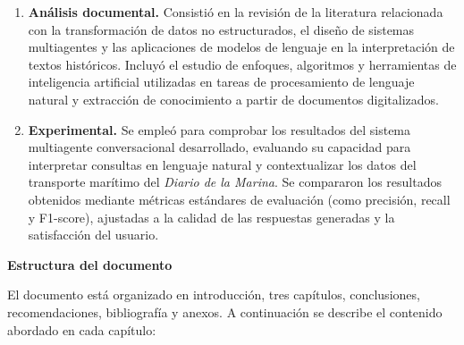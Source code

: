 	\begin{enumerate}
		\item \textbf{Análisis documental.} Consistió en la revisión de la literatura relacionada con la transformación de datos no estructurados, el diseño de sistemas multiagentes y las aplicaciones de modelos de lenguaje en la interpretación de textos históricos. Incluyó el estudio de enfoques, algoritmos y herramientas de inteligencia artificial utilizadas en tareas de procesamiento de lenguaje natural y extracción de conocimiento a partir de documentos digitalizados.
		
		\item \textbf{Experimental.} Se empleó para comprobar los resultados del sistema multiagente conversacional desarrollado, evaluando su capacidad para interpretar consultas en lenguaje natural y contextualizar los datos del transporte marítimo del \textit{Diario de la Marina}. Se compararon los resultados obtenidos mediante métricas estándares de evaluación (como precisión, recall y F1-score), ajustadas a la calidad de las respuestas generadas y la satisfacción del usuario.
	\end{enumerate}
	
	
\textbf{Estructura del documento}

El documento está organizado en introducción, tres capítulos, conclusiones, recomendaciones, bibliografía y anexos. A continuación se describe el contenido abordado en cada capítulo:

